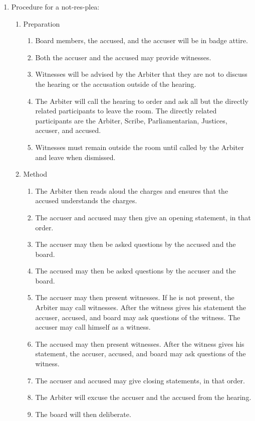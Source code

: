 \begin{enumerate}
		\item Procedure for a \gls{not-res-plea}:
			\begin{enumerate}
				\item Preparation
					\begin{enumerate}
						\item Board members, the accused, and the accuser will be in badge attire.
						\item Both the accuser and the accused may provide witnesses.
						\item Witnesses will be advised by the Arbiter that they are not to discuss the hearing or the accusation outside of the hearing.
						\item The Arbiter will call the hearing to order and ask all but the directly related participants to leave the room. The directly related participants are the Arbiter, Scribe, Parliamentarian, Justices, accuser, and accused. 
						\item Witnesses must remain outside the room until called by the Arbiter and leave when dismissed.
					\end{enumerate}
				\item Method
					\begin{enumerate}
						\item The Arbiter then reads aloud the charges and ensures that the accused understands the charges.
						\item The accuser and accused may then give an opening statement, in that order.
						\item The accuser may then be asked questions by the accused and the board.
						\item The accused may then be asked questions by the accuser and the board.
						\item The accuser may then present witnesses. If he is not present, the Arbiter may call witnesses. After the witness gives his statement the accuser, accused, and board may ask questions of the witness. The accuser may call himself as a witness.
						\item The accused may then present witnesses. After the witness gives his statement, the accuser, accused, and board may ask questions of the witness.
						\item The accuser and accused may give closing statements, in that order.
						\item The Arbiter will excuse the accuser and the accused from the hearing.
						\item The board will then deliberate.

\end{enumerate}
\end{enumerate}
\end{enumerate}
